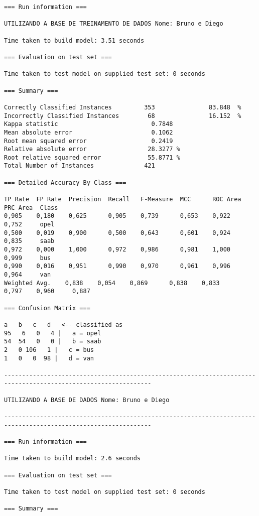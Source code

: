 \documentclass[
	article,			%
	11pt,				%
	oneside,			%
	a4paper,			%
	english,			%
	brazil,				%
	sumario=tradicional
	]{abntex2}
\begin{document}
\begin{lstlisting}
=== Run information ===

UTILIZANDO A BASE DE TREINAMENTO DE DADOS Nome: Bruno e Diego

Time taken to build model: 3.51 seconds

=== Evaluation on test set ===

Time taken to test model on supplied test set: 0 seconds

=== Summary ===

Correctly Classified Instances         353               83.848  %
Incorrectly Classified Instances        68               16.152  %
Kappa statistic                          0.7848
Mean absolute error                      0.1062
Root mean squared error                  0.2419
Relative absolute error                 28.3277 %
Root relative squared error             55.8771 %
Total Number of Instances              421     

=== Detailed Accuracy By Class ===

TP Rate  FP Rate  Precision  Recall   F-Measure  MCC      ROC Area  PRC Area  Class
0,905    0,180    0,625      0,905    0,739      0,653    0,922     0,752     opel
0,500    0,019    0,900      0,500    0,643      0,601    0,924     0,835     saab
0,972    0,000    1,000      0,972    0,986      0,981    1,000     0,999     bus
0,990    0,016    0,951      0,990    0,970      0,961    0,996     0,964     van
Weighted Avg.    0,838    0,054    0,869      0,838    0,833      0,797    0,960     0,887     

=== Confusion Matrix ===

a   b   c   d   <-- classified as
95   6   0   4 |   a = opel
54  54   0   0 |   b = saab
2   0 106   1 |   c = bus
1   0   0  98 |   d = van

---------------------------------------------------------------------------------------------------------------

UTILIZANDO A BASE DE DADOS Nome: Bruno e Diego

---------------------------------------------------------------------------------------------------------------

=== Run information ===

Time taken to build model: 2.6 seconds

=== Evaluation on test set ===

Time taken to test model on supplied test set: 0 seconds

=== Summary ===


\end{lstlisting}
\end{document}
